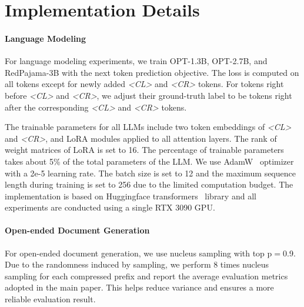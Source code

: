 \appendix

\section{Implementation Details}
\label{appendix:detail}
\paragraph{Language Modeling}
For language modeling experiments, we train OPT-1.3B, OPT-2.7B, and RedPajama-3B with the next token prediction objective. The loss is computed on all tokens except for newly added \textit{<CL>} and \textit{<CR>} tokens. For tokens right before \textit{<CL>} and \textit{<CR>}, we adjust their ground-truth label to be tokens right after 
the corresponding \textit{<CL>} and \textit{<CR>} tokens.

The trainable parameters for all LLMs include two token embeddings of \textit{<CL>} and \textit{<CR>}, and LoRA modules applied to all attention layers. The rank of weight matrices of LoRA is set to 16. The percentage of trainable parameters takes about 5\% of the total parameters of the LLM.
We use AdamW~\cite{adamw} optimizer with a 2e-5 learning rate. The batch size is set to 12 and the maximum sequence length during training is set to 256 due to the limited computation budget. The implementation is based on Huggingface transformers~\cite{wolf-etal-2020-transformers} library and all experiments are conducted using a single RTX 3090 GPU.
\paragraph{Open-ended Document Generation}
For open-ended document generation, we use nucleus sampling with top p$=$0.9. Due to the randomness induced by sampling, we perform 8 times nucleus sampling for each compressed prefix and report the average evaluation metrics adopted in the main paper. 
This helps reduce variance and ensures a more reliable evaluation result.
